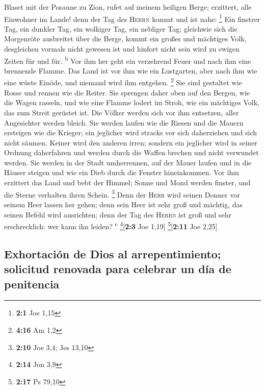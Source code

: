  Blaset mit der Posaune zu Zion, rufet auf meinem heiligen
Berge; erzittert, alle Einwohner im Lande! denn der Tag des
\textsc{Herrn} kommt und ist nahe: \footnote{\textbf{2:1} Joe 1,15}
 Ein finstrer Tag, ein dunkler Tag, ein wolkiger Tag, ein
nebliger Tag; gleichwie sich die Morgenröte ausbreitet über die Berge,
kommt ein großes und mächtiges Volk, desgleichen vormals nicht gewesen
ist und hinfort nicht sein wird zu ewigen Zeiten für und für.
\textsuperscript{b}  Vor ihm her geht ein verzehrend Feuer
und nach ihm eine brennende Flamme. Das Land ist vor ihm wie ein
Lustgarten, aber nach ihm wie eine wüste Einöde, und niemand wird ihm
entgehen. \footnote{\textbf{4:16} Am 1,2}  Sie sind
gestaltet wie Rosse und rennen wie die Reiter.  Sie
sprengen daher oben auf den Bergen, wie die Wagen rasseln, und wie eine
Flamme lodert im Stroh, wie ein mächtiges Volk, das zum Streit gerüstet
ist.  Die Völker werden sich vor ihm entsetzen, aller
Angesichter werden bleich.  Sie werden laufen wie die
Riesen und die Mauern ersteigen wie die Krieger; ein jeglicher wird
stracks vor sich daherziehen und sich nicht säumen. 
Keiner wird den anderen irren; sondern ein jeglicher wird in seiner
Ordnung daherfahren und werden durch die Waffen brechen und nicht
verwundet werden.  Sie werden in der Stadt umherrennen,
auf der Mauer laufen und in die Häuser steigen und wie ein Dieb durch
die Fenster hineinkommen.  Vor ihm erzittert das Land und
bebt der Himmel; Sonne und Mond werden finster, und die Sterne verhalten
ihren Schein. \footnote{\textbf{2:10} Joe 3,4; Jes 13,10}
 Denn der \textsc{Herr} wird seinen Donner vor seinem
Heer lassen her gehen; denn sein Heer ist sehr groß und mächtig, das
seinen Befehl wird ausrichten; denn der Tag des \textsc{Herrn} ist groß
und sehr erschrecklich: wer kann ihn leiden? \textsuperscript{e}
\footnote{\textbf{2:14} Jon 3,9}{[}\textbf{2:3} Joe 1,19{]}
\footnote{\textbf{2:17} Ps 79,10}{[}\textbf{2:11} Joe 2,25{]}

\hypertarget{exhortaciuxf3n-de-dios-al-arrepentimiento-solicitud-renovada-para-celebrar-un-duxeda-de-penitencia}{%
\subsection{Exhortación de Dios al arrepentimiento; solicitud renovada
para celebrar un día de
penitencia}\label{exhortaciuxf3n-de-dios-al-arrepentimiento-solicitud-renovada-para-celebrar-un-duxeda-de-penitencia}}

